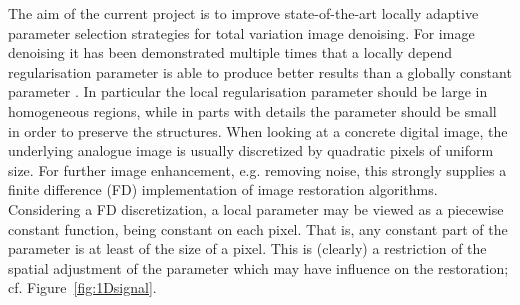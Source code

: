 \documentclass[enabledeprecatedfontcommands,cleardoublepage=empty,headsepline,twoside,11pt,DIV=15,BCOR=12mm,final]{scrartcl}
\begin{document}
The aim of the current project is to improve state-of-the-art locally adaptive parameter selection strategies for total variation image denoising. %
For image denoising it has been demonstrated multiple times that a locally depend regularisation parameter is able to produce better results than a globally constant parameter \cite{}. In particular the local regularisation parameter should be large in homogeneous regions, while in parts with details the parameter should be small in order to preserve the structures. When looking at a concrete digital image, the underlying analogue image is usually discretized by quadratic pixels of uniform size. For further image enhancement, e.g. removing noise, this strongly supplies a finite difference (FD) implementation of image restoration algorithms. Considering a FD discretization, a local parameter may be viewed as a piecewise constant function, being constant on each pixel. That is, any constant part of the parameter is at least of the size of a pixel. This is (clearly) a restriction of the spatial adjustment of the parameter which may have influence on the restoration; cf. Figure~\ref{fig:1Dsignal}.
\end{document}
